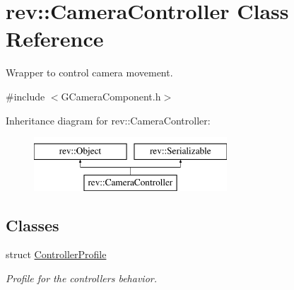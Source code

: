 \hypertarget{classrev_1_1_camera_controller}{}\section{rev\+::Camera\+Controller Class Reference}
\label{classrev_1_1_camera_controller}


Wrapper to control camera movement.  




{\ttfamily \#include $<$G\+Camera\+Component.\+h$>$}

Inheritance diagram for rev\+::Camera\+Controller\+:\begin{figure}[H]
\begin{center}
\leavevmode
\includegraphics[height=2.000000cm]{classrev_1_1_camera_controller}
\end{center}
\end{figure}
\subsection*{Classes}
\begin{DoxyCompactItemize}
\item 
struct \mbox{\hyperlink{structrev_1_1_camera_controller_1_1_controller_profile}{Controller\+Profile}}
\begin{DoxyCompactList}\small\item\em Profile for the controller\textquotesingle{}s behavior. \end{DoxyCompactList}\end{DoxyCompactItemize}
